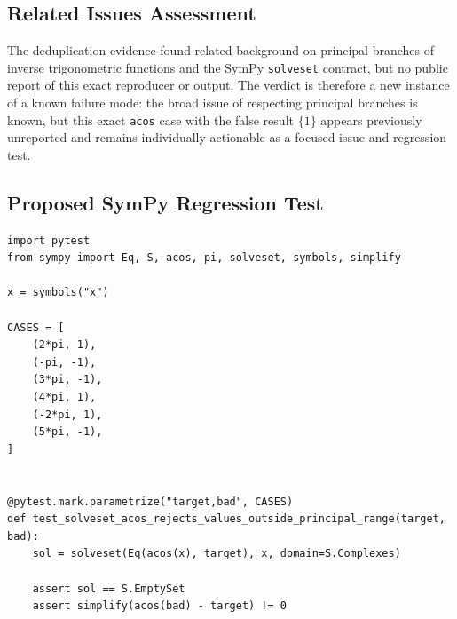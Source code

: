 \documentclass[11pt]{article}
\begin{document}
\subsection{Related Issues Assessment}

The deduplication evidence found related background on principal branches of
inverse trigonometric functions and the SymPy \texttt{solveset} contract, but no
public report of this exact reproducer or output.  The verdict is therefore a
new instance of a known failure mode: the broad issue of respecting principal
branches is known, but this exact \texttt{acos} case with the false result
\(\{1\}\) appears previously unreported and remains individually actionable as
a focused issue and regression test.

\subsection{Proposed SymPy Regression Test}

\medskip

\begin{lstlisting}[style=bugpython]
import pytest
from sympy import Eq, S, acos, pi, solveset, symbols, simplify

x = symbols("x")

CASES = [
    (2*pi, 1),
    (-pi, -1),
    (3*pi, -1),
    (4*pi, 1),
    (-2*pi, 1),
    (5*pi, -1),
]


@pytest.mark.parametrize("target,bad", CASES)
def test_solveset_acos_rejects_values_outside_principal_range(target, bad):
    sol = solveset(Eq(acos(x), target), x, domain=S.Complexes)

    assert sol == S.EmptySet
    assert simplify(acos(bad) - target) != 0
\end{lstlisting}
\end{document}
